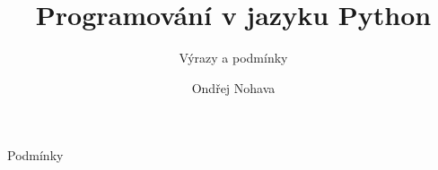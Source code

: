 \documentclass{beamer}
\title{Programování v jazyku Python}
\subtitle{Výrazy a podmínky}
\author{Ondřej Nohava}
\institute[DDMJH]{Dům dětí a mládeže Jindřichův Hradec}
\date{}
\begin{document}
\begin{frame}
\titlepage
\end{frame}

\begin{frame}[t]{Podmínky}


\end{frame}
\end{document}
